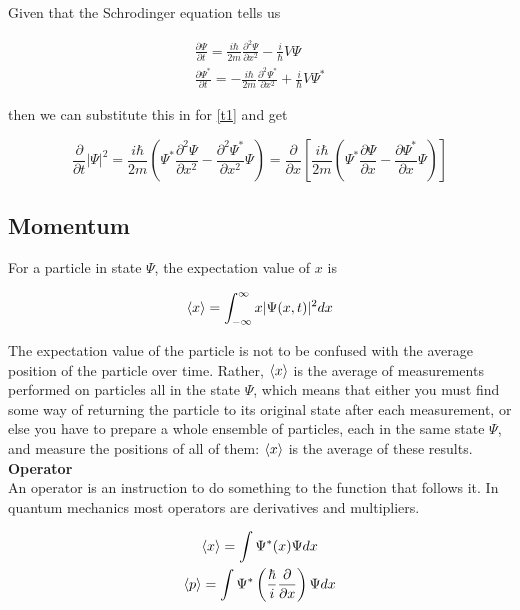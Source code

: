 \documentclass{article}
\begin{document}
\noindent Given that the Schrodinger equation tells us

\begin{gather}
    \frac{\partial \Psi}{\partial t} = \frac{i\hbar}{2m}\frac{\partial^2 \Psi}{\partial x^2} - \frac{i}{\hbar}V\Psi \\
    \frac{\partial \Psi^{*}}{\partial t} = -\frac{i\hbar}{2m}\frac{\partial^2 \Psi^{*}}{\partial x^2} + \frac{i}{\hbar}V\Psi^{*}
\end{gather}

\noindent then we can substitute this in for \eqref{t1} and get

\begin{equation}
    \frac{\partial}{\partial t} |\Psi|^2 = \frac{i\hbar}{2m} \left ( \Psi^{*}\frac{\partial^2 \Psi}{\partial x^2} - \frac{\partial^2 \Psi^{*}}{\partial x^2}\Psi\right ) = \frac{\partial}{\partial x} \left [ \frac{i\hbar}{2m} \left ( \Psi^{*}\frac{\partial \Psi}{\partial x} - \frac{\partial \Psi^{*}}{\partial x}\Psi\right )\right ]
\end{equation}

\subsection{Momentum}
For a particle in state $\Psi$, the expectation value of $x$ is

\begin{gather*}
    \braket{x} = \int_{-\infty}^{\infty} x |\Psi(x,t)|^2 dx
\end{gather*}

The expectation value of the particle is not to be confused with the average position of the particle over time. Rather, $\braket{x}$ is the average of measurements performed on particles all in the state $\Psi$, which means that either you must find some way of returning the particle to its original state after each measurement, or else you have to prepare a whole ensemble of particles, each in the same state $\Psi$, and measure the positions of all of them: $\braket{x}$ is the average of these results.\\

\noindent \textbf{Operator} \\
\indent An operator is an instruction to do something to the function that follows it. In quantum mechanics most operators are derivatives and multipliers.

\begin{gather*}
    \braket{x} = \int \Psi^{*} (x) \Psi dx \\
    \braket{p} = \int \Psi^{*} \left ( \frac{\hbar}{i} \frac{\partial}{\partial x}\right ) \Psi dx
\end{gather*}
\end{document}
